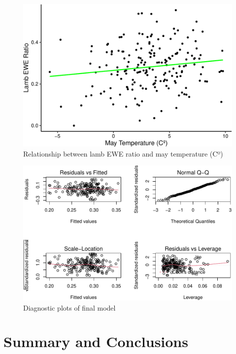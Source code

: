 \documentclass[
  12pt,
]{article}
\begin{document}
\begin{figure}
\centering
\includegraphics{FastFajardoPlasynski_ENV872_Project_files/figure-latex/unnamed-chunk-9-1.pdf}
\caption{Relationship between lamb EWE ratio and may temperature (Cº)}
\end{figure}

\begin{figure}
\centering
\includegraphics{FastFajardoPlasynski_ENV872_Project_files/figure-latex/unnamed-chunk-10-1.pdf}
\caption{Diagnostic plots of final model}
\end{figure}

\newpage

\hypertarget{summary-and-conclusions}{%
\section{Summary and Conclusions}\label{summary-and-conclusions}}
\end{document}
